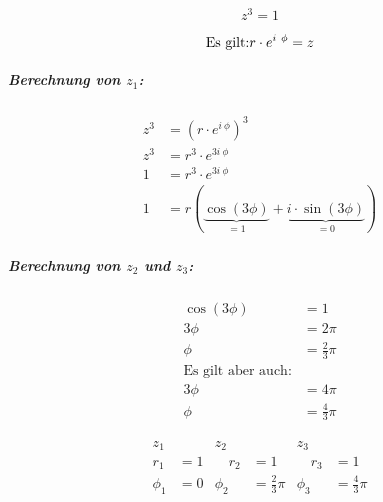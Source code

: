 \begin{uebung}
	\begin{question}
		\[
			z^3 = 1
		\]
	\end{question}
	\begin{solution}
		\[
			\text{Es gilt:}\\
			r \cdot e^{i\ \phi} = z
		\]

		\subparagraph{Berechnung von \( z_1 \):}


		\begin{align*}
			z^3 & = {\left(r \cdot e^{i\ \phi}\right)}^3                                           \\
			z^3 & = r^3 \cdot e^{3 i\ \phi}                                                        \\
			1   & = r^3 \cdot e^{3 i\ \phi}                                                        \\
			1   & = r(\underbrace{\cos{(3 \phi)}}_{=1} + \underbrace{i \cdot \sin{(3 \phi)}}_{=0})
		\end{align*}

		\subparagraph{Berechnung von \( z_2 \) und \( z_3 \):}

		\[
			\begin{alignedat}{1}
				\cos{(3 \phi)} &= 1 \\
				3 \phi &= 2 \pi \\
				\phi &= \frac{2}{3} \pi \\
				\text{Es gilt aber auch:} \\
				3 \phi &= 4 \pi \\
				\phi &= \frac{4}{3} \pi
			\end{alignedat}
		\]

		\[
			\begin{alignedat}{3}
				z_1    &     & z_2       &                   & z_3       &                   \\
				r_1    & = 1 & \quad r_2 & = 1               & \quad r_3 & = 1               \\
				\phi_1 & = 0 & \phi_2    & = \frac{2}{3} \pi & \phi_3    & = \frac{4}{3} \pi
			\end{alignedat}
		\]
	\end{solution}
\end{uebung}
